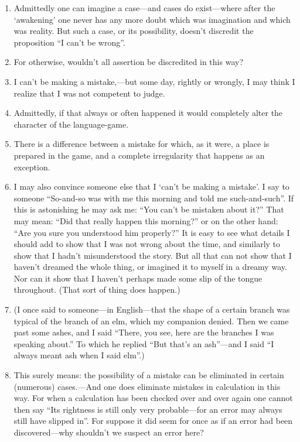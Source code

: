 \documentclass{book}
\begin{document}
\begin{enumerate}
\item
Admittedly one can imagine a case---and cases do exist---where after the
`awakening' one never has any more doubt which was imagination and which was
reality. But such a case, or its possibility, doesn't discredit the proposition
``I can't be wrong''.

\item
For otherwise, wouldn't all assertion be discredited in this way?

\item
I can't be making a mistake,---but some day, rightly or wrongly, I may think I
realize that I was not competent to judge.

\item
Admittedly, if that always or often happened it would completely alter the
character of the language-game.

\item
There is a difference between a mistake for which, as it were, a place is
prepared in the game, and a complete irregularity that happens as an exception.

\item
I may also convince someone else that I `can't be making a mistake'.  I say to
someone ``So-and-so was with me this morning and told me such-and-such''. If
this is astonishing he may ask me: ``You can't be mistaken about it?'' That may
mean: ``Did that really happen this morning?'' or on the other hand: ``Are you
sure you understood him properly?'' It is easy to see what details I should add
to show that I was not wrong about the time, and similarly to show that I
hadn't misunderstood the story. But all that can not show that I haven't
dreamed the whole thing, or imagined it to myself in a dreamy way. Nor can it
show that I haven't perhaps made some slip of the tongue throughout. (That sort
of thing does happen.)

\item
(I once said to someone---in English---that the shape of a certain branch was
typical of the branch of an elm, which my companion denied. Then we came past
some ashes, and I said ``There, you see, here are the branches I was speaking
about.'' To which he replied ``But that's an ash''---and I said ``I always
meant ash when I said elm''.)

\item
This surely means: the possibility of a mistake can be eliminated in certain
(numerous) cases.---And one does eliminate mistakes in calculation in this way.
For when a calculation has been checked over and over again one cannot then say
``Its rightness is still only very probable---for an error may always still
have slipped in''. For suppose it did seem for once as if an error had been
discovered---why shouldn't we suspect an error here?


\end{enumerate}
\end{document}
